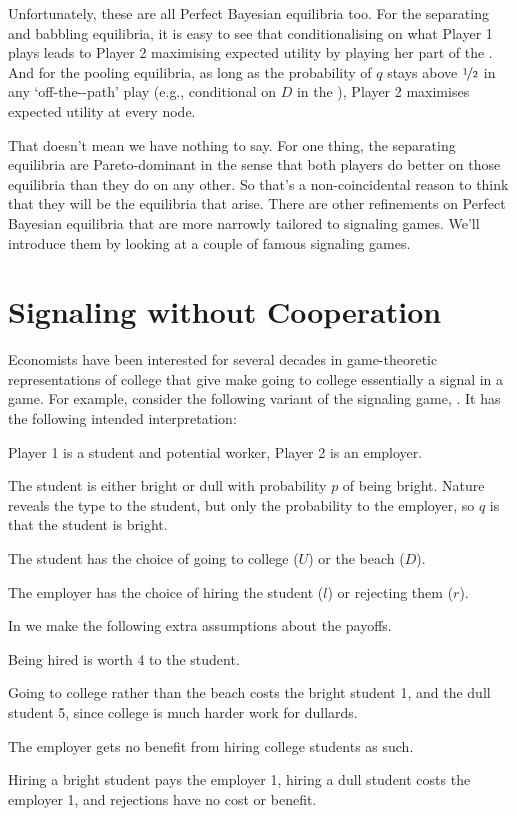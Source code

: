\noindent Unfortunately, these are all Perfect Bayesian equilibria too. For the separating and babbling equilibria, it is easy to see that conditionalising on what Player 1 plays leads to Player 2 maximising expected utility by playing her part of the \eqm. And for the pooling equilibria, as long as the probability of $q$ stays above $\nicefrac{1}{2}$ in any `off-the-\eqm-path' play (e.g., conditional on $D$ in the  \eqm), Player 2 maximises expected utility at every node.

That doesn't mean we have nothing to say. For one thing, the separating equilibria are Pareto-dominant in the sense that both players do better on those equilibria than they do on any other. So that's a non-coincidental reason to think that they will be the equilibria that arise. There are other refinements on Perfect Bayesian equilibria that are more narrowly tailored to signaling games. We'll introduce them by looking at a couple of famous signaling games.

\section{Signaling without Cooperation}

Economists have been interested for several decades in game-theoretic representations of college that give make going to college essentially a signal in a game. For example, consider the following variant of the signaling game, . It has the following intended interpretation:

\begin{itemize*}
\item Player 1 is a student and potential worker, Player 2 is an employer.
\item The student is either bright or dull with probability $p$ of being bright. Nature reveals the type to the student, but only the probability to the employer, so $q$ is that the student is bright.
\item The student has the choice of going to college ($U$) or the beach ($D$).
\item The employer has the choice of hiring the student ($l$) or rejecting them ($r$).
\end{itemize*}

\noindent In  we make the following extra assumptions about the payoffs.

\begin{itemize*}
\item Being hired is worth 4 to the student.
\item Going to college rather than the beach costs the bright student 1, and the dull student 5, since college is much harder work for dullards.
\item The employer gets no benefit from hiring college students as such.
\item Hiring a bright student pays the employer 1, hiring a dull student costs the employer 1, and rejections have no cost or benefit.
\end{itemize*}

